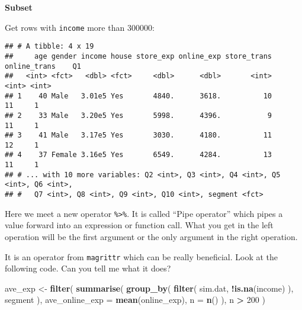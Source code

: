 \documentclass[
]{article}
\newenvironment{Shaded}{\begin{snugshade}}{\end{snugshade}}
\newcommand{\DataTypeTok}[1]{\textcolor[rgb]{0.13,0.29,0.53}{#1}}
\newcommand{\DecValTok}[1]{\textcolor[rgb]{0.00,0.00,0.81}{#1}}
\newcommand{\KeywordTok}[1]{\textcolor[rgb]{0.13,0.29,0.53}{\textbf{#1}}}
\newcommand{\NormalTok}[1]{#1}
\newcommand{\OperatorTok}[1]{\textcolor[rgb]{0.81,0.36,0.00}{\textbf{#1}}}
\newcommand{\StringTok}[1]{\textcolor[rgb]{0.31,0.60,0.02}{#1}}
\begin{document}
\textbf{Subset}

Get rows with \texttt{income} more than 300000:

\begin{Shaded}
\end{Shaded}

\begin{verbatim}
## # A tibble: 4 x 19
##     age gender income house store_exp online_exp store_trans online_trans    Q1
##   <int> <fct>   <dbl> <fct>     <dbl>      <dbl>       <int>        <int> <int>
## 1    40 Male   3.01e5 Yes       4840.      3618.          10           11     1
## 2    33 Male   3.20e5 Yes       5998.      4396.           9           11     1
## 3    41 Male   3.17e5 Yes       3030.      4180.          11           12     1
## 4    37 Female 3.16e5 Yes       6549.      4284.          13           11     1
## # ... with 10 more variables: Q2 <int>, Q3 <int>, Q4 <int>, Q5 <int>, Q6 <int>,
## #   Q7 <int>, Q8 <int>, Q9 <int>, Q10 <int>, segment <fct>
\end{verbatim}

Here we meet a new operator \texttt{\%\textgreater{}\%}. It is called
``Pipe operator'' which pipes a value forward into an expression or
function call. What you get in the left operation will be the first
argument or the only argument in the right operation.

\begin{Shaded}
\end{Shaded}

It is an operator from \texttt{magrittr} which can be really beneficial.
Look at the following code. Can you tell me what it does?

\begin{Shaded}
\begin{Highlighting}[]
\NormalTok{ave_exp <-}\StringTok{ }\KeywordTok{filter}\NormalTok{( }
  \KeywordTok{summarise}\NormalTok{(}
    \KeywordTok{group_by}\NormalTok{( }
      \KeywordTok{filter}\NormalTok{(}
\NormalTok{        sim.dat, }
        \OperatorTok{!}\KeywordTok{is.na}\NormalTok{(income)}
\NormalTok{      ), }
\NormalTok{      segment}
\NormalTok{    ), }
    \DataTypeTok{ave_online_exp =} \KeywordTok{mean}\NormalTok{(online_exp), }
    \DataTypeTok{n =} \KeywordTok{n}\NormalTok{()}
\NormalTok{  ), }
\NormalTok{  n }\OperatorTok{>}\StringTok{ }\DecValTok{200}
\NormalTok{) }
\end{Highlighting}
\end{Shaded}
\end{document}
